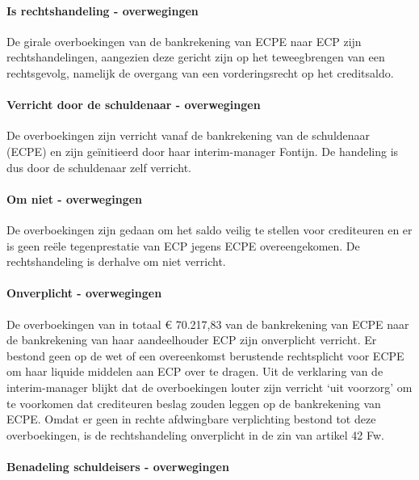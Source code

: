 \documentclass[
  dutch,
  a4paper,
]{article}
\begin{document}
\paragraph{Is rechtshandeling - overwegingen}\label{is-rechtshandeling---overwegingen-53}

De girale overboekingen van de bankrekening van ECPE naar ECP zijn rechtshandelingen, aangezien deze gericht zijn op het teweegbrengen van een rechtsgevolg, namelijk de overgang van een vorderingsrecht op het creditsaldo.

\paragraph{Verricht door de schuldenaar - overwegingen}\label{verricht-door-de-schuldenaar---overwegingen-53}

De overboekingen zijn verricht vanaf de bankrekening van de schuldenaar (ECPE) en zijn geïnitieerd door haar interim-manager Fontijn. De handeling is dus door de schuldenaar zelf verricht.

\paragraph{Om niet - overwegingen}\label{om-niet---overwegingen-53}

De overboekingen zijn gedaan om het saldo veilig te stellen voor crediteuren en er is geen reële tegenprestatie van ECP jegens ECPE overeengekomen. De rechtshandeling is derhalve om niet verricht.

\paragraph{Onverplicht - overwegingen}\label{onverplicht---overwegingen-53}

De overboekingen van in totaal € 70.217,83 van de bankrekening van ECPE naar de bankrekening van haar aandeelhouder ECP zijn onverplicht verricht. Er bestond geen op de wet of een overeenkomst berustende rechtsplicht voor ECPE om haar liquide middelen aan ECP over te dragen. Uit de verklaring van de interim-manager blijkt dat de overboekingen louter zijn verricht `uit voorzorg' om te voorkomen dat crediteuren beslag zouden leggen op de bankrekening van ECPE. Omdat er geen in rechte afdwingbare verplichting bestond tot deze overboekingen, is de rechtshandeling onverplicht in de zin van artikel 42 Fw.

\paragraph{Benadeling schuldeisers - overwegingen}\label{benadeling-schuldeisers---overwegingen-53}
\end{document}
